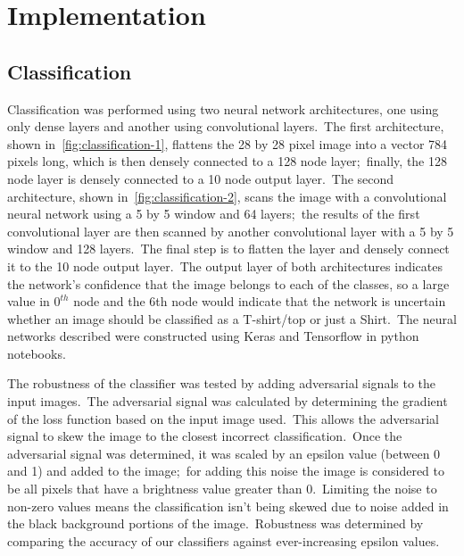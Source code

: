 \documentclass[conference]{IEEEtran}
\begin{document}
    \section{Implementation}\label{sec:implementation}

    \subsection{Classification}\label{subsec:implementation-classification}

    Classification was performed using two neural network architectures, one using only dense layers and another using convolutional layers.\ The first architecture, shown in~\autoref{fig:classification-1}, flattens the 28 by 28 pixel image into a vector 784 pixels long, which is then densely connected to a 128 node layer;\ finally, the 128 node layer is densely connected to a 10 node output layer.\ The second architecture, shown in~\autoref{fig:classification-2}, scans the image with a convolutional neural network using a 5 by 5 window and 64 layers;\ the results of the first convolutional layer are then scanned by another convolutional layer with a 5 by 5 window and 128 layers.\ The final step is to flatten the layer and densely connect it to the 10 node output layer.\ The output layer of both architectures indicates the network's confidence that the image belongs to each of the classes, so a large value in \(0^{th}\) node and the 6th node would indicate that the network is uncertain whether an image should be classified as a T-shirt/top or just a Shirt.\ The neural networks described were constructed using Keras and Tensorflow in python notebooks.

    The robustness of the classifier was tested by adding adversarial signals to the input images.\ The adversarial signal was calculated by determining the gradient of the loss function based on the input image used.\ This allows the adversarial signal to skew the image to the closest incorrect classification.\ Once the adversarial signal was determined, it was scaled by an epsilon value (between 0 and 1) and added to the image;\ for adding this noise the image is considered to be all pixels that have a brightness value greater than 0.\ Limiting the noise to non-zero values means the classification isn't being skewed due to noise added in the black background portions of the image.\ Robustness was determined by comparing the accuracy of our classifiers against ever-increasing epsilon values.

    \begin{figure}
        \caption{}
        \label{fig:classification-1}
    \end{figure}
\end{document}
